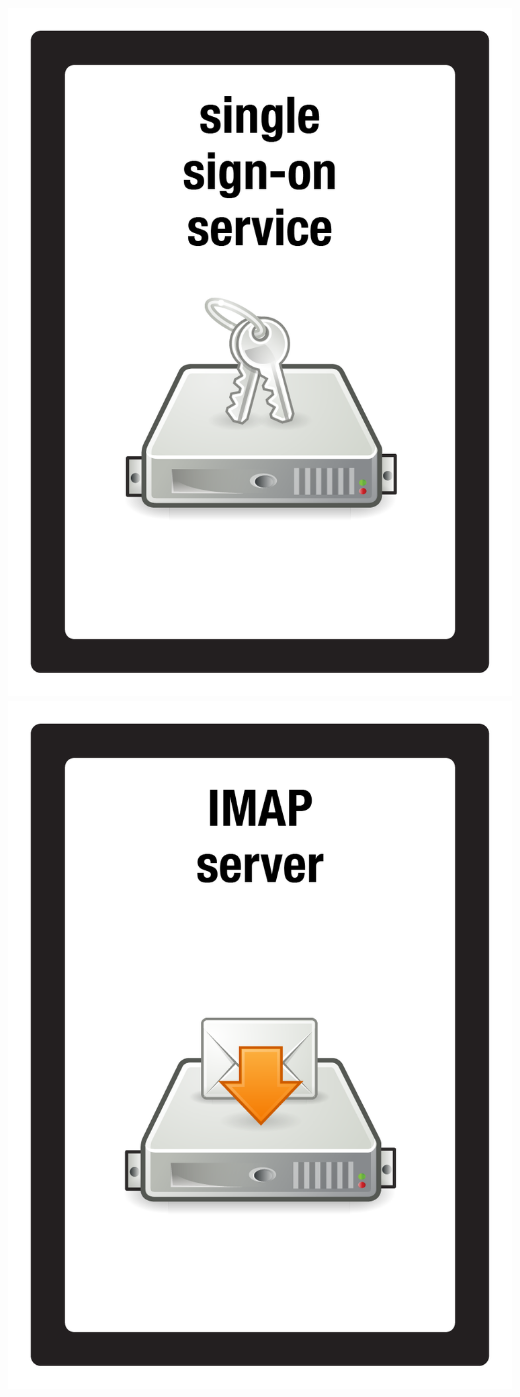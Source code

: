 \documentclass{letter}
\begin{document}
\includegraphics{patch/patch_sso_serv}
\includegraphics{patch/patch_imap_server}
\end{document}
